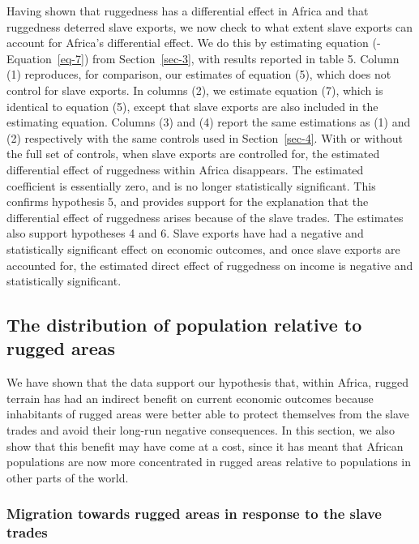 \documentclass[
  letterpaper,
  DIV=11,
  numbers=noendperiod]{scrartcl}
\begin{document}
Having shown that ruggedness has a differential effect in Africa and
that ruggedness deterred slave exports, we now check to what extent
slave exports can account for Africa's differential effect. We do this
by estimating equation (-Equation~\ref{eq-7}) from Section~\ref{sec-3},
with results reported in table 5. Column (1) reproduces, for comparison,
our estimates of equation (5), which does not control for slave exports.
In columns (2), we estimate equation (7), which is identical to equation
(5), except that slave exports are also included in the estimating
equation. Columns (3) and (4) report the same estimations as (1) and (2)
respectively with the same controls used in Section~\ref{sec-4}. With or
without the full set of controls, when slave exports are controlled for,
the estimated differential effect of ruggedness within Africa
disappears. The estimated coefficient is essentially zero, and is no
longer statistically significant. This confirms hypothesis 5, and
provides support for the explanation that the differential effect of
ruggedness arises because of the slave trades. The estimates also
support hypotheses 4 and 6. Slave exports have had a negative and
statistically significant effect on economic outcomes, and once slave
exports are accounted for, the estimated direct effect of ruggedness on
income is negative and statistically significant.

\subsection{The distribution of population relative to rugged
areas}\label{the-distribution-of-population-relative-to-rugged-areas}

We have shown that the data support our hypothesis that, within Africa,
rugged terrain has had an indirect benefit on current economic outcomes
because inhabitants of rugged areas were better able to protect
themselves from the slave trades and avoid their long-run negative
consequences. In this section, we also show that this benefit may have
come at a cost, since it has meant that African populations are now more
concentrated in rugged areas relative to populations in other parts of
the world.

\subsubsection{Migration towards rugged areas in response to the slave
trades}\label{migration-towards-rugged-areas-in-response-to-the-slave-trades}
\end{document}
